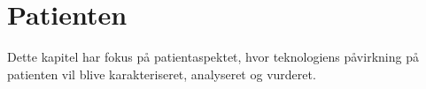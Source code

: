\chapter{Patienten}
Dette kapitel har fokus på patientaspektet, hvor teknologiens påvirkning på patienten vil blive karakteriseret, analyseret og vurderet. 



